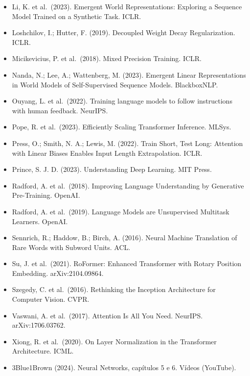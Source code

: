 \documentclass[
  11pt,
]{article}
\begin{document}
\begin{itemize}
  Estimation in Chess-Playing Language Models. arXiv:2403.15498.
\item
  Li, K. et al.~(2023). Emergent World Representations: Exploring a
  Sequence Model Trained on a Synthetic Task. ICLR.
\item
  Loshchilov, I.; Hutter, F. (2019). Decoupled Weight Decay
  Regularization. ICLR.
\item
  Micikevicius, P. et al.~(2018). Mixed Precision Training. ICLR.
\item
  Nanda, N.; Lee, A.; Wattenberg, M. (2023). Emergent Linear
  Representations in World Models of Self-Supervised Sequence Models.
  BlackboxNLP.
\item
  Ouyang, L. et al.~(2022). Training language models to follow
  instructions with human feedback. NeurIPS.
\item
  Pope, R. et al.~(2023). Efficiently Scaling Transformer Inference.
  MLSys.
\item
  Press, O.; Smith, N. A.; Lewis, M. (2022). Train Short, Test Long:
  Attention with Linear Biases Enables Input Length Extrapolation. ICLR.
\item
  Prince, S. J. D. (2023). Understanding Deep Learning. MIT Press.
\item
  Radford, A. et al.~(2018). Improving Language Understanding by
  Generative Pre-Training. OpenAI.
\item
  Radford, A. et al.~(2019). Language Models are Unsupervised Multitask
  Learners. OpenAI.
\item
  Sennrich, R.; Haddow, B.; Birch, A. (2016). Neural Machine Translation
  of Rare Words with Subword Units. ACL.
\item
  Su, J. et al.~(2021). RoFormer: Enhanced Transformer with Rotary
  Position Embedding. arXiv:2104.09864.
\item
  Szegedy, C. et al.~(2016). Rethinking the Inception Architecture for
  Computer Vision. CVPR.
\item
  Vaswani, A. et al.~(2017). Attention Is All You Need. NeurIPS.
  arXiv:1706.03762.
\item
  Xiong, R. et al.~(2020). On Layer Normalization in the Transformer
  Architecture. ICML.
\item
  3Blue1Brown (2024). Neural Networks, capítulos 5 e 6. Vídeos
  (YouTube).
\end{itemize}
\end{document}
